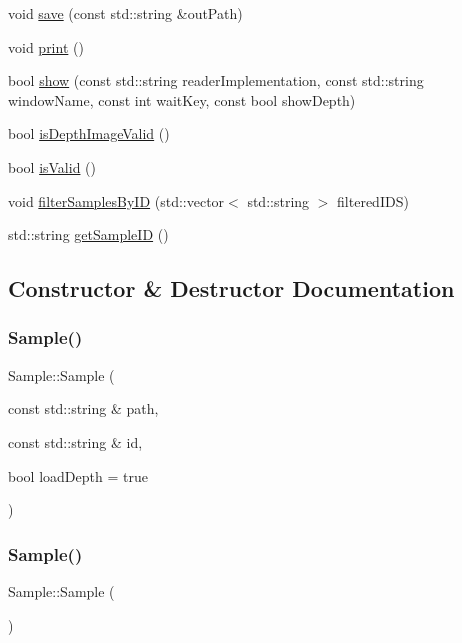 \begin{DoxyCompactItemize}
void \hyperlink{struct_sample_a9bf371e9070c521390867961965e8c94}{save} (const std\+::string \&out\+Path)
\item 
void \hyperlink{struct_sample_a9d1fe0b4de7a046026520b5efa39aac8}{print} ()
\item 
bool \hyperlink{struct_sample_af210b104d04dd438902828102f3ff2f7}{show} (const std\+::string reader\+Implementation, const std\+::string window\+Name, const int wait\+Key, const bool show\+Depth)
\item 
bool \hyperlink{struct_sample_a081726861f4977cb88fcdf709dd58cc9}{is\+Depth\+Image\+Valid} ()
\item 
bool \hyperlink{struct_sample_a8dbfc18d3b69992cb7865437242e1f55}{is\+Valid} ()
\item 
void \hyperlink{struct_sample_adbfe8d1087bd0ded0edcd572a7beb7e8}{filter\+Samples\+By\+ID} (std\+::vector$<$ std\+::string $>$ filtered\+I\+DS)
\item 
std\+::string \hyperlink{struct_sample_adead1781500bbf8508eae6f983621d3a}{get\+Sample\+ID} ()
\end{DoxyCompactItemize}


\subsection{Constructor \& Destructor Documentation}
\mbox{\label{struct_sample_a01a02e244812649a05144cca680a06bb}} 
\subsubsection{\texorpdfstring{Sample()}{Sample()}\hspace{0.1cm}{\footnotesize\ttfamily [1/9]}}
{\footnotesize\ttfamily Sample\+::\+Sample (\begin{DoxyParamCaption}\item[{const std\+::string \&}]{path,  }\item[{const std\+::string \&}]{id,  }\item[{bool}]{load\+Depth = {\ttfamily true} }\end{DoxyParamCaption})}

\mbox{\label{struct_sample_a48a4cf559a1ff65b7d4776c262236e27}} 
\subsubsection{\texorpdfstring{Sample()}{Sample()}\hspace{0.1cm}{\footnotesize\ttfamily [2/9]}}
{\footnotesize\ttfamily Sample\+::\+Sample (\begin{DoxyParamCaption}{ }\end{DoxyParamCaption})}


